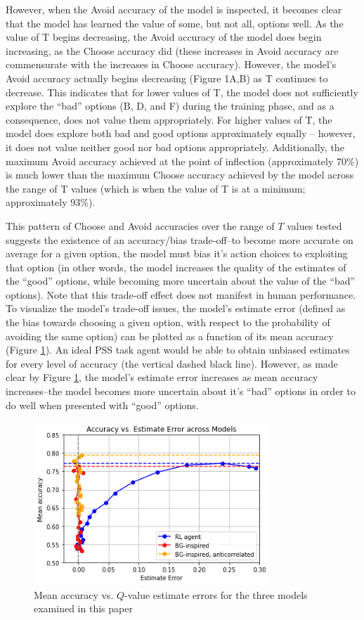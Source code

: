 \documentclass[10pt,letterpaper]{article}
\begin{document}
However, when the Avoid accuracy of the model is inspected, it becomes clear that the model has learned the value of some, but not all, options well. As the value of T begins decreasing, the Avoid accuracy of the model does begin increasing, as the Choose accuracy did (these increases in Avoid accuracy are commensurate with the increases in Choose  accuracy). However, the model’s Avoid accuracy actually begins decreasing (Figure 1A,B) as T continues to decrease. This indicates that for lower values of T, the model does not sufficiently explore the ``bad'' options (B, D, and F) during the training phase, and as a consequence, does not value them appropriately. For higher values of T, the model does explore both bad and good options approximately equally – however, it does not value neither good nor bad options appropriately. Additionally, the maximum Avoid accuracy achieved at the point of inflection (approximately 70\%) is much lower than the maximum Choose accuracy achieved by the model across the range of T values (which is when the value of T is at a minimum; approximately 93\%). 

This pattern of Choose and Avoid accuracies over the range of $T$ values tested suggests the existence of an accuracy/bias trade-off--to become more accurate on average for a given option, the model must bias it's action choices to exploiting that option (in other words, the model increases the quality of the estimates of the ``good'' options, while becoming more uncertain about the value of the ``bad'' options). Note that this trade-off effect does not manifest in human performance. To visualize the model's trade-off issues, the model’s estimate error (defined as the bias towards choosing a given option, with respect to the probability of avoiding the same option) can be plotted as a function of its mean accuracy (Figure \ref{roc}). An ideal PSS task agent would be able to obtain unbiased estimates for every level of accuracy (the vertical dashed black line). However, as made clear by Figure \ref{roc}, the model's estimate error increases as mean accuracy increases--the model becomes more uncertain about it’s ``bad'' options in order to do well when presented with ``good'' options.

\begin{figure}[ht]
	\begin{center}
		\includegraphics[width=3.5in]{roc-agents.png}
	\end{center}
	\caption{Mean accuracy vs. $Q$-value estimate errors for the three models examined in this paper} 
	\label{roc}
\end{figure}
\end{document}
